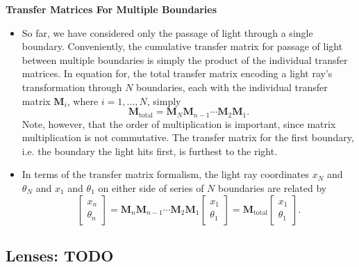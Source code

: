 \documentclass[11pt, a4paper]{article}
\newcommand{\mat}[1]{\mathbf{#1}} %
\begin{document}
\textbf{Transfer Matrices For Multiple Boundaries}
\begin{itemize}

    \item So far, we have considered only the passage of light through a single boundary. Conveniently, the cumulative transfer matrix for passage of light between multiple boundaries is simply the product of the individual transfer matrices. In equation for, the total transfer matrix encoding a light ray's transformation through $ N $ boundaries, each with the individual transfer matrix $ \mat{M}_{i} $, where $ i = 1, \ldots, N $, simply
    \begin{equation*}
        \mat{M}_{\text{total}} = \mat{M}_{N}\mat{M}_{n-1} \cdots \mat{M}_{2} \mat{M}_{1}.
    \end{equation*}
    Note, however, that the order of multiplication is important, since matrix multiplication is not commutative. The transfer matrix for the first boundary, i.e. the boundary the light hits first, is furthest to the right.

    \item In terms of the transfer matrix formalism, the light ray coordinates $ x_{N} $ and $ \theta_{N} $ and $ x_{1} $ and $ \theta_{1} $ on either side of series of $ N $ boundaries are related by
    \begin{equation*}
        \begin{bmatrix}
            x_{n} \\
            \theta_{n}
        \end{bmatrix}
        = \mat{M}_{n} \mat{M}_{n-1} \cdots \mat{M}_{2} \mat{M}_{1} 
        \begin{bmatrix}
            x_{1}\\
            \theta_{1}
        \end{bmatrix}
        = \mat{M}_{\text{total}}
        \begin{bmatrix}
            x_{1}\\
            \theta_{1}
        \end{bmatrix}.
    \end{equation*}

\end{itemize}

\subsection{Lenses: TODO}
\end{document}
